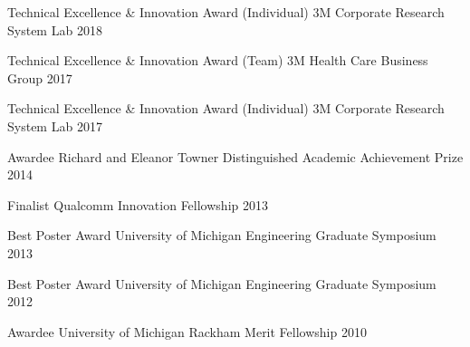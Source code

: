

\begin{cvhonors}

  \cvhonor
    {Technical Excellence \& Innovation Award (Individual)} %
    {3M Corporate Research System Lab} %
    {} %
    {2018} %

  \cvhonor
    {Technical Excellence \& Innovation Award (Team)} %
    {3M Health Care Business Group} %
    {} %
    {2017} %

  \cvhonor
    {Technical Excellence \& Innovation Award (Individual)} %
    {3M Corporate Research System Lab} %
    {} %
    {2017} %

  \cvhonor
    {Awardee} %
    {Richard and Eleanor Towner Distinguished Academic Achievement Prize} %
    {} %
    {2014} %

  \cvhonor
    {Finalist} %
    {Qualcomm Innovation Fellowship} %
    {} %
    {2013} %

  \cvhonor
    {Best Poster Award} %
    {University of Michigan Engineering Graduate Symposium} %
    {} %
    {2013} %

  \cvhonor
    {Best Poster Award} %
    {University of Michigan Engineering Graduate Symposium} %
    {} %
    {2012} %

  \cvhonor
    {Awardee} %
    {University of Michigan Rackham Merit Fellowship} %
    {} %
    {2010} %

\end{cvhonors}

